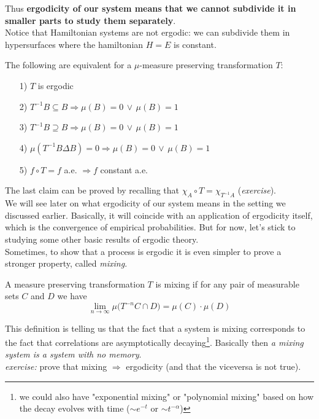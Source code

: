 Thus \textbf{ergodicity of our system means that we cannot subdivide it in smaller parts to study them separately}.
\\Notice that Hamiltonian systems are not ergodic: we can subdivide them in hypersurfaces where the hamiltonian $H=E$ is constant. 
\begin{lemma}
    The following are equivalent for a $\mu$-measure preserving transformation $T$:
    \begin{itemize}
        \item[1)] $T$ is ergodic
        \item[2)] $T^{-1}B \subseteq B \Rightarrow \mu(B) = 0 \, \vee \, \mu(B) = 1$
        \item[3)] $T^{-1}B \supseteq B \Rightarrow \mu(B) = 0 \, \vee \, \mu(B) = 1$
        \item[4)] $\mu (T^{-1}B \Delta B) = 0 \Rightarrow \mu(B) = 0 \, \vee \, \mu(B) = 1$
        \item[5)] $f \circ T = f$ a.e. $\Rightarrow f$ constant a.e.
    \end{itemize}
\end{lemma}
The last claim can be proved by recalling that $\chi_A \circ T = \chi_{T^{-1}A}$ (\textit{exercise}). 
\\We will see later on what ergodicity of our system means in the setting we discussed earlier. Basically, it will coincide with an application of ergodicity itself, which is the convergence of empirical probabilities. But for now, let's stick to studying some other basic results of ergodic theory.
\\Sometimes, to show that a process is ergodic it is even simpler to prove a stronger property, called \textit{mixing}. 
\begin{definition}[Mixing]
    A measure preserving transformation $T$ is mixing if for any pair of measurable sets $C$ and $D$ we have
    \begin{equation}
        \lim_{n \rightarrow \infty} \mu \big( T^{-n}C \cap D \big) = \mu(C) \cdot \mu(D)
    \end{equation}
\end{definition}
This definition is telling us that the fact that a system is mixing corresponds to the fact that correlations are asymptotically decaying\footnote{we could also have "exponential mixing" or "polynomial mixing" based on how the decay evolves with time ($\sim e^{-t}$ or $\sim t^{-\alpha}$)}. Basically then \textit{a mixing system is a system with no memory}. 
\\\textit{exercise:} prove that mixing $\Rightarrow$ ergodicity (and that the viceversa is not true).
